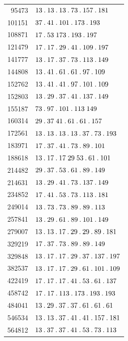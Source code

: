\begin{longtable}{@{}r|l@{}}
95473 & $13\pdot 13\pdot 13\pdot 73\pdot 157\pdot 181$\\
101151 & $37\pdot 41\pdot 101\pdot 173\pdot 193$\\
108871 & $17\pdot 53\;173\pdot 193\pdot 197$\\
121479 & $17\pdot 17\pdot 29\pdot 41\pdot 109\pdot 197$\\
141777 & $13\pdot 17\pdot 37\pdot 73\pdot 113\pdot 149$\\
144808 & $13\pdot 41\pdot 61\pdot 61\pdot 97\pdot 109$\\
152762 & $13\pdot 41\pdot 41\pdot 97\pdot 101\pdot 109$\\
152803 & $13\pdot 29\pdot 37\pdot 41\pdot 137\pdot 149$\\
155187 & $73\pdot 97\pdot 101\pdot 113\;149$\\
160314 & $29\pdot 37\;41\pdot 61\pdot 61\pdot 157$\\
172561 & $13\pdot 13\pdot 13\pdot 13\pdot 37\pdot 73\pdot 193$\\
183971 & $17\pdot 37\pdot 41\pdot 73\pdot 89\pdot 101$\\
188618 & $13\pdot 17\pdot 17\;29\;53\pdot 61\pdot 101$\\
214482 & $29\pdot 37\pdot 53\pdot 61\pdot 89\pdot 149$\\
214631 & $13\pdot 29\pdot 41\pdot 73\pdot 137\pdot 149$\\
234852 & $17\pdot 41\pdot 53\pdot 73\pdot 113\pdot 181$\\
249014 & $13\pdot 73\pdot 73\pdot 89\pdot 89\pdot 113$\\
257841 & $13\pdot 29\pdot 61\pdot 89\pdot 101\pdot 149$\\
279007 & $13\pdot 13\pdot 17\pdot 29\pdot 29\pdot 89\pdot 181$\\
329219 & $17\pdot 37\pdot 73\pdot 89\pdot 89\pdot 149$\\
329848 & $13\pdot 17\pdot 17\pdot 29\pdot 37\pdot 137\pdot 197$\\
382537 & $13\pdot 17\pdot 17\pdot 29\pdot 61\pdot 101\pdot 109$\\
422419 & $17\pdot 17\pdot 17\pdot 41\pdot 53\pdot 61\pdot 137$\\
458742 & $17\pdot 17\pdot 113\pdot 173\pdot 193\pdot 193$\\
484041 & $13\pdot 29\pdot 37\pdot 37\pdot 61\pdot 61\pdot 61$\\
546534 & $13\pdot 13\pdot 37\pdot 41\pdot 41\pdot 157\pdot 181$\\
564812 & $13\pdot 37\pdot 37\pdot 41\pdot 53\pdot 73\pdot 113$\\

\end{longtable}

